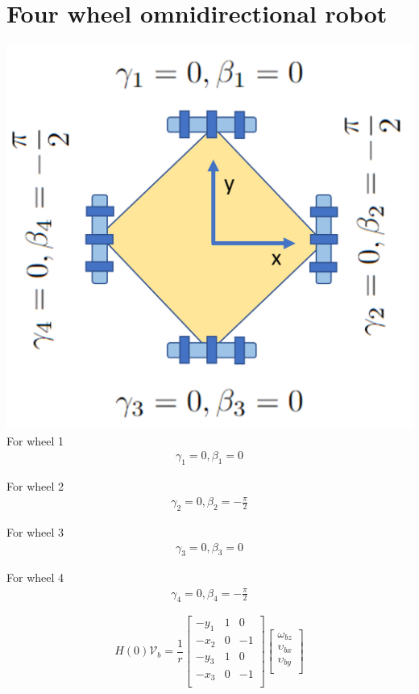 \documentclass{article}
\begin{document}
\section{Four wheel omnidirectional robot}
\includegraphics{robot_4_wheel_kinematics.png}\\

For wheel 1
\begin{align*}
    \gamma_1 = 0, \beta_1 = 0
\end{align*}

For wheel 2
\begin{align*}
    \gamma_2 = 0, \beta_2 = - \frac{\pi}{2}
\end{align*}

For wheel 3
\begin{align*}
    \gamma_3 = 0, \beta_3 = 0
\end{align*}

For wheel 4
\begin{align*}
    \gamma_4 = 0, \beta_4 =  -\frac{\pi}{2}
\end{align*}

\begin{equation}
    H(0)\mathcal{V}_b = \frac{1}{r}
    \begin{bmatrix}
        -y_1 & 1 & 0  \\
        -x_2 & 0 & -1 \\
        -y_3 & 1 & 0  \\
        -x_3 & 0 & -1 \\
    \end{bmatrix}
    \begin{bmatrix}
        \omega_{bz}   \\
        \upsilon_{bx} \\
        \upsilon_{by} \\
    \end{bmatrix}
\end{equation}
\end{document}
